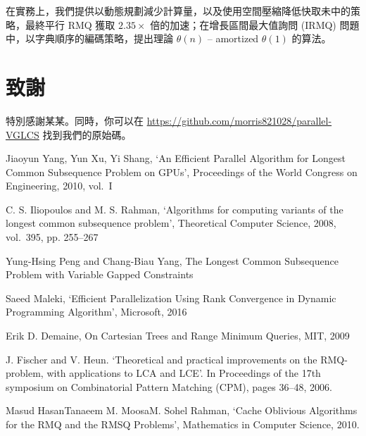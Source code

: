 \documentclass{gapd}
\begin{document}
在實務上，我們提供以動態規劃減少計算量，以及使用空間壓縮降低快取未中的策略，最終平行 RMQ 獲取 $2.35 \times$ 倍的加速；在增長區間最大值詢問 (IRMQ) 問題中，以字典順序的編碼策略，提出理論 $\theta(n)$ -- amortized $\theta(1)$  的算法。

\section*{致謝}

特別感謝某某。同時，你可以在 \url{https://github.com/morris821028/parallel-VGLCS} 找到我們的原始碼。

\begin{thebibliography}{4}

 Jiaoyun Yang, Yun Xu, Yi Shang, `An Efficient Parallel Algorithm for Longest Common Subsequence Problem on GPUs', Proceedings of the World Congress on Engineering, 2010, vol.~I 

 C. S. Iliopoulos and M. S. Rahman, `Algorithms for computing variants of the longest common subsequence problem', Theoretical Computer Science, 2008, vol.~395, pp. 255--267

 Yung-Hsing Peng and Chang-Biau Yang, The Longest Common Subsequence Problem with Variable Gapped Constraints

 Saeed Maleki, `Efficient Parallelization Using Rank Convergence in Dynamic Programming Algorithm', Microsoft, 2016

 Erik D. Demaine, On Cartesian Trees and Range Minimum Queries, MIT, 2009

 J. Fischer and V. Heun. `Theoretical and practical improvements on the RMQ-problem, with applications to LCA and LCE'. In Proceedings of the 17th symposium on Combinatorial Pattern Matching (CPM), pages 36–48, 2006.

 Masud HasanTanaeem M. MoosaM. Sohel Rahman, `Cache Oblivious Algorithms for the RMQ and the RMSQ Problems', Mathematics in Computer Science, 2010.

\end{thebibliography}
\end{document}
